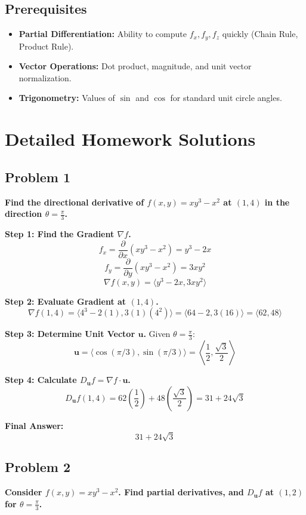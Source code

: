 \documentclass{article}
\begin{document}
\subsection{Prerequisites}
\begin{itemize}
    \item \textbf{Partial Differentiation:} Ability to compute $f_x, f_y, f_z$ quickly (Chain Rule, Product Rule).
    \item \textbf{Vector Operations:} Dot product, magnitude, and unit vector normalization.
    \item \textbf{Trigonometry:} Values of $\sin$ and $\cos$ for standard unit circle angles.
\end{itemize}

\newpage

\section{Detailed Homework Solutions}

\subsection*{Problem 1}
\textbf{Find the directional derivative of $f(x, y) = xy^3 - x^2$ at $(1, 4)$ in the direction $\theta = \frac{\pi}{3}$.}

\textbf{Step 1: Find the Gradient $\nabla f$.}
\[ f_x = \frac{\partial}{\partial x}(xy^3 - x^2) = y^3 - 2x \]
\[ f_y = \frac{\partial}{\partial y}(xy^3 - x^2) = 3xy^2 \]
\[ \nabla f(x, y) = \langle y^3 - 2x, 3xy^2 \rangle \]

\textbf{Step 2: Evaluate Gradient at $(1, 4)$.}
\[ \nabla f(1, 4) = \langle 4^3 - 2(1), 3(1)(4^2) \rangle = \langle 64 - 2, 3(16) \rangle = \langle 62, 48 \rangle \]

\textbf{Step 3: Determine Unit Vector $\mathbf{u}$.}
Given $\theta = \frac{\pi}{3}$:
\[ \mathbf{u} = \langle \cos(\pi/3), \sin(\pi/3) \rangle = \left\langle \frac{1}{2}, \frac{\sqrt{3}}{2} \right\rangle \]

\textbf{Step 4: Calculate $D_{\mathbf{u}}f = \nabla f \cdot \mathbf{u}$.}
\[ D_{\mathbf{u}}f(1, 4) = 62\left(\frac{1}{2}\right) + 48\left(\frac{\sqrt{3}}{2}\right) = 31 + 24\sqrt{3} \]

\textbf{Final Answer:}
\[ \boxed{31 + 24\sqrt{3}} \]

\hrulefill

\subsection*{Problem 2}
\textbf{Consider $f(x, y) = xy^3 - x^2$. Find partial derivatives, and $D_{\mathbf{u}}f$ at $(1, 2)$ for $\theta = \frac{\pi}{3}$.}
\end{document}
